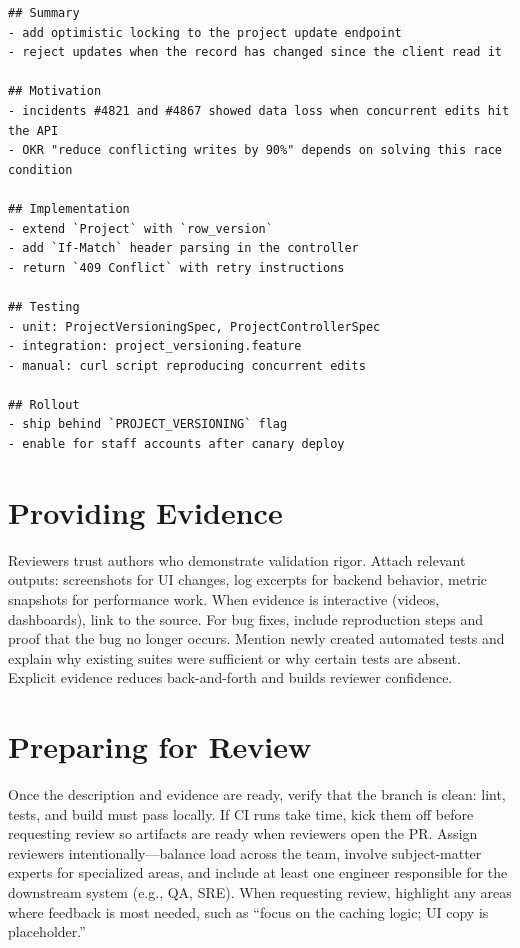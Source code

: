 \begin{lstlisting}[style=markdown,caption={Example PR description with context and validation}]
## Summary
- add optimistic locking to the project update endpoint
- reject updates when the record has changed since the client read it

## Motivation
- incidents #4821 and #4867 showed data loss when concurrent edits hit the API
- OKR "reduce conflicting writes by 90%" depends on solving this race condition

## Implementation
- extend `Project` with `row_version`
- add `If-Match` header parsing in the controller
- return `409 Conflict` with retry instructions

## Testing
- unit: ProjectVersioningSpec, ProjectControllerSpec
- integration: project_versioning.feature
- manual: curl script reproducing concurrent edits

## Rollout
- ship behind `PROJECT_VERSIONING` flag
- enable for staff accounts after canary deploy
\end{lstlisting}

\section{Providing Evidence}
Reviewers trust authors who demonstrate validation rigor. Attach relevant outputs: screenshots for UI changes, log excerpts for backend behavior, metric snapshots for performance work. When evidence is interactive (videos, dashboards), link to the source. For bug fixes, include reproduction steps and proof that the bug no longer occurs. Mention newly created automated tests and explain why existing suites were sufficient or why certain tests are absent. Explicit evidence reduces back-and-forth and builds reviewer confidence.

\section{Preparing for Review}
Once the description and evidence are ready, verify that the branch is clean: lint, tests, and build must pass locally. If CI runs take time, kick them off before requesting review so artifacts are ready when reviewers open the PR. Assign reviewers intentionally---balance load across the team, involve subject-matter experts for specialized areas, and include at least one engineer responsible for the downstream system (e.g., QA, SRE). When requesting review, highlight any areas where feedback is most needed, such as ``focus on the caching logic; UI copy is placeholder.''

